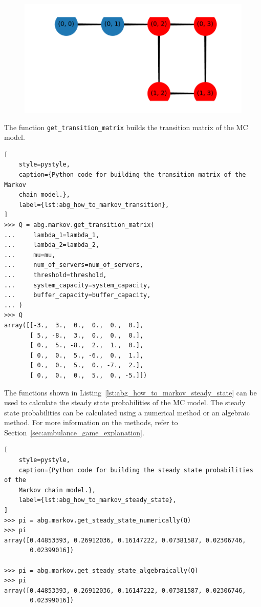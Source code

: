 \begin{figure}[H]
    \centering
    \includegraphics[width=\textwidth]{chapters/00_appendix/01_ambulance_game_library/Bin/visualise_markov.pdf}
    
\end{figure}

The function \texttt{get\_transition\_matrix} builds the transition matrix
of the MC model.

\begin{lstlisting}[
    style=pystyle,
    caption={Python code for building the transition matrix of the Markov
    chain model.},
    label={lst:abg_how_to_markov_transition},
]
>>> Q = abg.markov.get_transition_matrix(
...     lambda_1=lambda_1,
...     lambda_2=lambda_2,
...     mu=mu,
...     num_of_servers=num_of_servers,
...     threshold=threshold,
...     system_capacity=system_capacity,
...     buffer_capacity=buffer_capacity,
... )
>>> Q
array([[-3.,  3.,  0.,  0.,  0.,  0.],
       [ 5., -8.,  3.,  0.,  0.,  0.],
       [ 0.,  5., -8.,  2.,  1.,  0.],
       [ 0.,  0.,  5., -6.,  0.,  1.],
       [ 0.,  0.,  5.,  0., -7.,  2.],
       [ 0.,  0.,  0.,  5.,  0., -5.]])

\end{lstlisting}

The functions shown in Listing~\ref{lst:abg_how_to_markov_steady_state} can be
used to calculate the steady state probabilities of the MC model.
The steady state probabilities can be calculated using a numerical method or
an algebraic method.
For more information on the methods, refer to
Section~\ref{sec:ambulance_game_explanation}.

\begin{lstlisting}[
    style=pystyle,
    caption={Python code for building the steady state probabilities of the
    Markov chain model.},
    label={lst:abg_how_to_markov_steady_state},
]
>>> pi = abg.markov.get_steady_state_numerically(Q)
>>> pi
array([0.44853393, 0.26912036, 0.16147222, 0.07381587, 0.02306746,
       0.02399016])

>>> pi = abg.markov.get_steady_state_algebraically(Q)
>>> pi
array([0.44853393, 0.26912036, 0.16147222, 0.07381587, 0.02306746,
       0.02399016])
    
\end{lstlisting}

